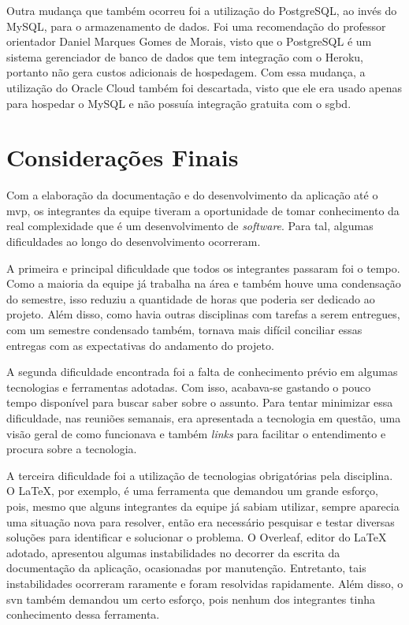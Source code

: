\documentclass[
    12pt,               %
    openright,          %
    oneside,
    a4paper,            %
    english,            %
    brazil              %
    ]{ifsp-spo-inf-ctds} %
\begin{document}
Outra mudança que também ocorreu foi a utilização do PostgreSQL, ao invés do MySQL, para o armazenamento de dados. Foi uma recomendação do professor orientador Daniel Marques Gomes de Morais, visto que o PostgreSQL é um sistema gerenciador de banco de dados que tem integração com o Heroku, portanto não gera custos adicionais de hospedagem. Com essa mudança, a utilização do Oracle Cloud também foi descartada, visto que ele era usado apenas para hospedar o MySQL e não possuía integração gratuita com o \ac{sgbd}.


\chapter[Considerações Finais]{Considerações Finais}

Com a elaboração da documentação e do desenvolvimento da aplicação até o \ac{mvp}, os integrantes da equipe tiveram a oportunidade de tomar conhecimento da real complexidade que é um desenvolvimento de \textit{\gls{software}}. Para tal, algumas dificuldades ao longo do desenvolvimento ocorreram. 

A primeira e principal dificuldade que todos os integrantes passaram foi o tempo. Como a maioria da equipe já trabalha na área e também houve uma condensação do semestre, isso reduziu a quantidade de horas que poderia ser dedicado ao projeto. Além disso, como havia outras disciplinas com tarefas a serem entregues, com um semestre condensado também, tornava mais difícil conciliar essas entregas com as expectativas do andamento do projeto.

A segunda dificuldade encontrada foi a falta de conhecimento prévio em algumas tecnologias e ferramentas adotadas. Com isso, acabava-se gastando o pouco tempo disponível para buscar saber sobre o assunto. Para tentar minimizar essa dificuldade, nas reuniões semanais, era apresentada a tecnologia em questão, uma visão geral de como funcionava e também \textit{links} para facilitar o entendimento e procura sobre a tecnologia.

A terceira dificuldade foi a utilização de tecnologias obrigatórias pela disciplina. O LaTeX, por exemplo, é uma ferramenta que demandou um grande esforço, pois, mesmo que alguns integrantes da equipe já sabiam utilizar, sempre aparecia uma situação nova para resolver, então era necessário pesquisar e testar diversas soluções para identificar e solucionar o problema. O Overleaf, editor do LaTeX adotado, apresentou algumas instabilidades no decorrer da escrita da documentação da aplicação, ocasionadas por manutenção. Entretanto, tais instabilidades ocorreram raramente e foram resolvidas rapidamente. Além disso, o \gls{svn} também demandou um certo esforço, pois nenhum dos integrantes tinha conhecimento dessa ferramenta.
\end{document}
